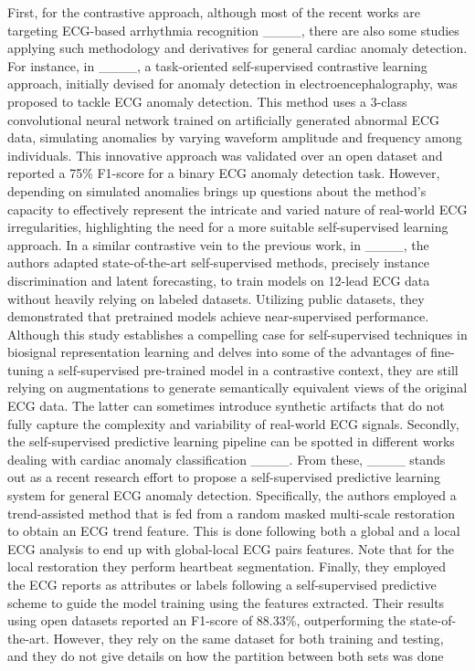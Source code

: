 First, for the contrastive approach, although most of the recent works are targeting ECG-based arrhythmia recognition ____, there are also some studies applying such methodology and derivatives for general cardiac anomaly detection. For instance, in ____, a task-oriented self-supervised contrastive learning approach, initially devised for anomaly detection in electroencephalography, was proposed to tackle ECG anomaly detection. This method uses a 3-class convolutional neural network trained on artificially generated abnormal ECG data, simulating anomalies by varying waveform amplitude and frequency among individuals. This innovative approach was validated over an open dataset and reported a 75\% F1-score for a binary ECG anomaly detection task. However, depending on simulated anomalies brings up questions about the method's capacity to effectively represent the intricate and varied nature of real-world ECG irregularities, highlighting the need for a more suitable self-supervised learning approach. In a similar contrastive vein to the previous work, in ____, the authors adapted state-of-the-art self-supervised methods, precisely instance discrimination and latent forecasting, to train models on 12-lead ECG data without heavily relying on labeled datasets. Utilizing public datasets, they demonstrated that pretrained models achieve near-supervised performance. Although this study establishes a compelling case for self-supervised techniques in biosignal representation learning and delves into some of the advantages of fine-tuning a self-supervised pre-trained model in a contrastive context, they are still relying on augmentations to generate semantically equivalent views of the original ECG data. The latter can sometimes introduce synthetic artifacts that do not fully capture the complexity and variability of real-world ECG signals. Secondly, the self-supervised predictive learning pipeline can be spotted in different works dealing with cardiac anomaly classification ____. From these, ____ stands out as a recent research effort to propose a self-supervised predictive learning system for general ECG anomaly detection. Specifically, the authors employed a trend-assisted method that is fed from a random masked multi-scale restoration to obtain an ECG trend feature. This is done following both a global and a local ECG analysis to end up with global-local ECG pairs features. Note that for the local restoration they perform heartbeat segmentation. Finally, they employed the ECG reports as attributes or labels following a self-supervised predictive scheme to guide the model training using the features extracted. Their results using open datasets reported an F1-score of 88.33\%, outperforming the state-of-the-art. However, they rely on the same dataset for both training and testing, and they do not give details on how the partition between both sets was done %
